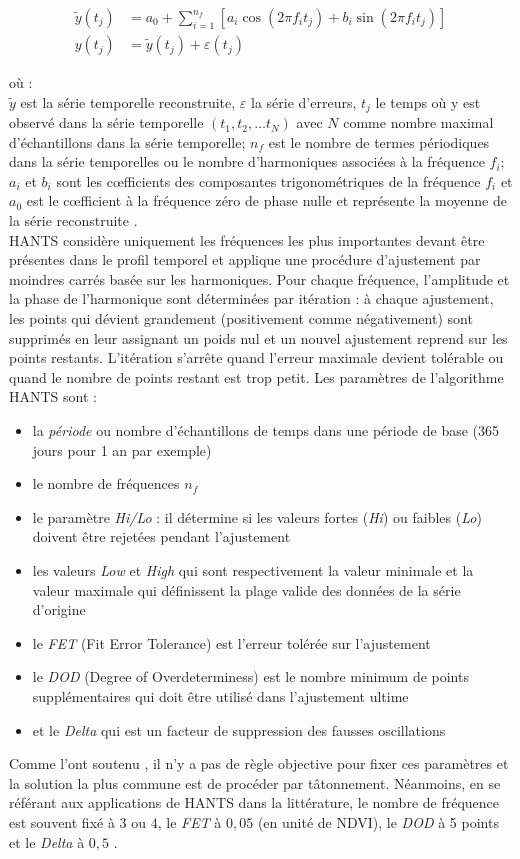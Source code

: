 \begin{align}   
    \tilde{y}(t_{j}) &= a_{0} + \sum_{i=1}^{n_{f}} [a_{i}\cos(2\pi f_{i} t_{j}) + b_{i}\sin(2\pi f_{i} t_{j})] \\
    y(t_{j}) &= \tilde{y}(t_{j}) + \varepsilon(t_{j})
\end{align}

où : \\
$\tilde{y}$ est la série temporelle reconstruite, $\varepsilon$ la série d'erreurs, $t_{j}$ le temps où y est observé
dans la série temporelle $(t_{1}, t_{2}, \ldots{} t_{N} )$ avec $N$ comme nombre maximal d’échantillons dans
la série temporelle; $n_{f}$ est le nombre de termes périodiques dans la série temporelles ou
le nombre d’harmoniques associées à la fréquence $f_{i}$; $a_{i}$ et $b_{i}$ sont les c\oe fficients des
composantes trigonométriques de la fréquence $f_{i}$ et $a_{0}$ est le c\oe fficient à la fréquence zéro de phase nulle et représente la moyenne de la série reconstruite \citep{Zhou2015}.
\\HANTS considère uniquement les fréquences les plus importantes devant être présentes dans le profil temporel et applique une procédure d'ajustement par moindres carrés basée sur les harmoniques. Pour chaque fréquence, l'amplitude et la phase de l'harmonique sont déterminées par itération : à chaque ajustement, les points qui dévient grandement (positivement comme négativement) sont supprimés en leur assignant un poids nul et un nouvel ajustement reprend sur les points restants. L'itération s'arrête quand l'erreur maximale devient tolérable ou quand le nombre de points restant est trop petit. Les paramètres de l'algorithme HANTS sont :
\begin{itemize}
 \item la \emph{période} ou nombre d'échantillons de temps dans une période de base (365 jours pour 1 an par exemple)
 \item le nombre de fréquences $n_{f}$
 \item le paramètre \emph{Hi/Lo} : il détermine si les valeurs fortes (\emph{Hi}) ou faibles (\emph{Lo}) doivent être rejetées pendant l'ajustement
 \item les valeurs \emph{Low} et \emph{High} qui sont respectivement la valeur minimale et la valeur maximale
 qui définissent la plage valide des données de la série d'origine
 \item le \emph{FET} (Fit Error Tolerance) est l'erreur tolérée sur l'ajustement
 \item le \emph{DOD} (Degree of Overdeterminess) est le nombre minimum de points supplémentaires qui doit être utilisé dans l'ajustement ultime
 \item et le \emph{Delta} qui est un facteur de suppression des fausses oscillations \citep{Roerink2000}\end{itemize}
Comme l'ont soutenu \citet{Roerink2000}, il n'y a pas de règle objective pour fixer ces paramètres et la solution la plus commune est de procéder par tâtonnement. Néanmoins, en se référant aux applications de HANTS dans la littérature, le nombre de fréquence est souvent fixé à $3$ ou $4$, le \emph{FET} à $0,05$ (en unité de NDVI), le  \emph{DOD} à 5 points et le \emph{Delta} à $0,5$ \citep{Roerink2000,Zhou2015}.


